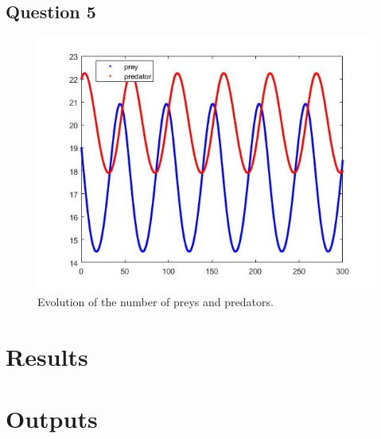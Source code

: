 \documentclass[a4paper, 11pt]{article}
\begin{document}
	
	\subsection*{Question 5}
	
	\begin{figure}[H]
		\centering
		\includegraphics[width=\linewidth]{ex5.jpg}
		\caption{Evolution of the number of preys and predators.}
		\label{fig:ex5}
	\end{figure}

	
	\section*{Results}
	
	
	\section*{Outputs}
	
	
	
\end{document}

